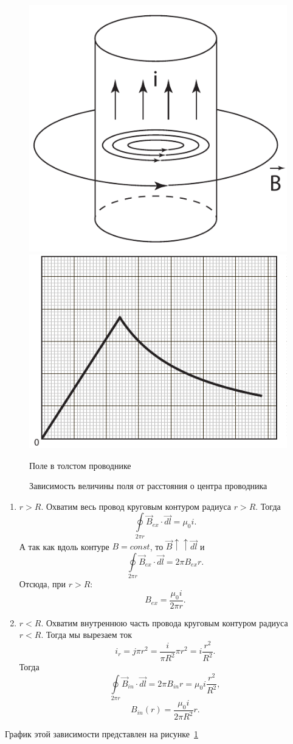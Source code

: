     \begin{figure}[!t]
        \center
        \includegraphics[width=.47\textwidth]{lec08/conductor_B.pdf}
        \includegraphics[width=.47\textwidth]{lec08/conductor_B_plot.pdf}
        \parbox[t]{.47\textwidth}{\caption{Поле в толстом проводнике}}
        \parbox[t]{.47\textwidth}{\caption{Зависимость величины поля от
            расстояния о центра проводника}
            \label{fig:B_in_fat_wire}}
    \end{figure}

    \begin{solution}
        \begin{enumerate}
            \item \( r > R \). Охватим весь провод круговым контуром радиуса
                \( r > R \). Тогда
                \[
                    \oint\limits_{2\pi r} \vec{B}_{ex}\cdot\vec{dl} = \mu_0 i.
                \]
                А так как вдоль контуре \( B = const \), то 
                \( \vec{B} \uparrow\uparrow \vec{dl} \) и
                \[
                    \oint\limits_{2\pi r}\vec{B}_{ex}\cdot\vec{dl} = 2\pi B_{ex}r.
                \]
                Отсюда, при \( r > R \):
                \[
                    B_{ex} = \frac{\mu_0 i}{2\pi r}.
                \]
                
            \item \( r < R \). Охватим внутреннюю часть провода круговым
            контуром радиуса \( r < R \). Тогда мы вырезаем ток
            \[
                i_r = j \pi r^2 = \frac{i}{\pi R^2}\pi r^2 = i\frac{r^2}{R^2}.
            \]
            Тогда
            \[
                \oint\limits_{2\pi r} \vec{B}_{in}\cdot\vec{dl} =
                2\pi B_{in} r = \mu_0 i \frac{r^2}{R^2},
            \]
            \[
                B_{in}(r) = \frac{\mu_0 i}{2\pi R^2}r.
            \]
        \end{enumerate}
        
        График этой зависимости представлен на рисунке~\ref{fig:B_in_fat_wire}
    \end{solution}
    
